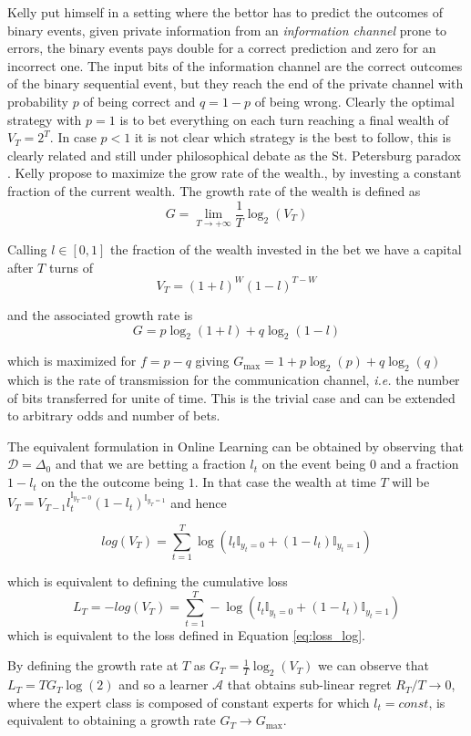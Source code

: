 Kelly put himself in a setting where the bettor has to predict the outcomes of binary events, given private information from an \emph{information channel} prone to errors, the binary events pays double for a correct prediction and zero for an incorrect one. The input bits of the information channel are the correct outcomes of the binary sequential event, but they reach the end of the private channel with probability $p$ of being correct and $q=1-p$ of being wrong. Clearly the optimal strategy with $p=1$ is to bet everything on each turn reaching a final wealth of $V_T=2^T$. In case $p<1$ it is not clear which strategy is the best to follow, this is clearly related and still under philosophical debate as the St. Petersburg paradox \cite{samuelson1977st}. Kelly propose to maximize the grow rate of the wealth., by investing a constant fraction of the current wealth. The growth rate of the wealth is defined as 
$$G=\lim\limits_{T\to+\infty}\frac{1}{T}\log_2(V_T)$$

Calling $l\in[0,1]$ the fraction of the wealth invested in the bet we have a capital after $T$ turns of 
$$V_T=(1+l)^{W}(1-l)^{T-W}$$ 

and the associated growth rate is 
$$G=p\log_2(1+l)+q\log_2(1-l)$$

which is maximized for $f=p-q$ giving $G_{\max}=1+p\log_2(p)+q\log_2(q)$ which is the rate of transmission for the communication channel, \emph{i.e.} the number of bits transferred for unite of time. This is the trivial case and can be extended to arbitrary odds and number of bets.

The equivalent formulation in Online Learning can be obtained by observing that $\mathcal D=\Delta_0$ and that we are betting a fraction $l_t$ on the event being $0$ and a fraction $1-l_t$ on the the outcome being $1$. In that case the wealth at time $T$ will be $V_T=V_{T-1}l_t^{\mathbb I_{y_T=0}}(1-l_t)^{\mathbb I_{y_T=1}}$ and hence 

\begin{equation}
log(V_T)=\sum\limits_{t=1}^T\log(l_t\mathbb I_{y_t=0}+(1-l_t)\mathbb I_{y_t=1})
\end{equation}

which is equivalent to defining the cumulative loss 
$$L_T=-log(V_T)=\sum\limits_{t=1}^T-\log(l_t\mathbb I_{y_t=0}+(1-l_t)\mathbb I_{y_t=1})$$
which is equivalent to the loss defined in Equation \eqref{eq:loss_log}.

By defining the growth rate at $T$ as $G_T=\frac{1}{T}\log_2(V_T)$ we can observe that $L_T=TG_T\log(2)$ and so a learner $\mathcal A$ that obtains sub-linear regret $R_T/T\to0$, where the expert class is composed of constant experts for which $l_t=const$, is equivalent to obtaining a growth rate $G_T\to G_{\max}$.

